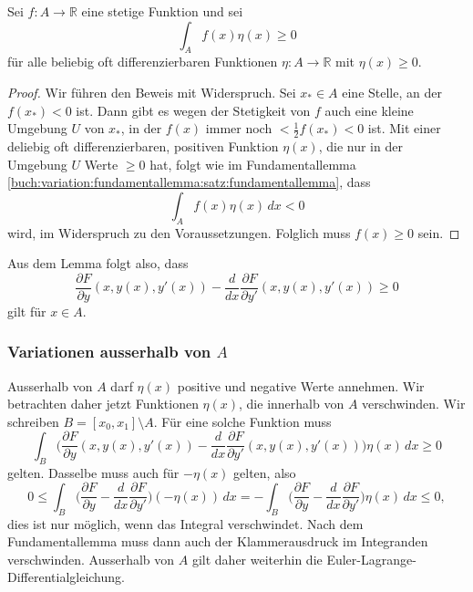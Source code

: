\begin{satz}
Sei $f\colon A\to\mathbb{R}$ eine stetige Funktion und sei
\[
\int_A f(x)\eta(x)\ge 0
\]
für alle beliebig oft differenzierbaren Funktionen $\eta\colon A\to\mathbb{R}$
mit $\eta(x)\ge 0$.
\end{satz}

\begin{proof}
Wir führen den Beweis mit Widerspruch.
Sei $x_*\in A$ eine Stelle, an der $f(x_*)<0$ ist.
Dann gibt es wegen der Stetigkeit von $f$ auch eine kleine Umgebung $U$ von
$x_*$, in der $f(x)$ immer noch $<\frac12f(x_*)<0$ ist.
Mit einer deliebig oft differenzierbaren, positiven Funktion $\eta(x)$,
die nur in der Umgebung $U$ Werte $\ge 0$ hat, folgt wie im
Fundamentallemma \ref{buch:variation:fundamentallemma:satz:fundamentallemma},
dass
\[
\int_A f(x)\eta(x)\,dx < 0
\]
wird, im Widerspruch zu den Voraussetzungen.
Folglich muss $f(x)\ge 0$ sein.
\end{proof}

Aus dem Lemma folgt also, dass
\begin{equation}
\frac{\partial F}{\partial y}(x,y(x),y'(x))
-
\frac{d}{dx}
\frac{\partial F}{\partial y'}(x,y(x),y'(x))
\ge 0
\end{equation}
gilt für $x\in A$.

%
%
\subsubsection{Variationen ausserhalb von $A$}
Ausserhalb von $A$ darf $\eta(x)$ positive und negative Werte annehmen.
Wir betrachten daher jetzt Funktionen $\eta(x)$, die innerhalb von $A$
verschwinden.
Wir schreiben $B=[x_0,x_1]\setminus A$.
Für eine solche Funktion muss
\[
\int_B \biggl(
\frac{\partial F}{\partial y}(x,y(x),y'(x))
-
\frac{d}{dx}
\frac{\partial F}{\partial y'}(x,y(x),y'(x))
\biggr)
\eta(x)
\,dx
\ge 0
\]
gelten.
Dasselbe muss auch für $-\eta(x)$ gelten, also
\[
0
\le
\int_B \biggl(
\frac{\partial F}{\partial y}
-
\frac{d}{dx}
\frac{\partial F}{\partial y'}
\biggr)
(-\eta(x))
\,dx
=
-
\int_B \biggl(
\frac{\partial F}{\partial y}
-
\frac{d}{dx}
\frac{\partial F}{\partial y'}
\biggr)
\eta(x)
\,dx
\le 0,
\]
dies ist nur möglich, wenn das Integral verschwindet.
Nach dem Fundamentallemma muss dann auch der Klammerausdruck
im Integranden verschwinden.
Ausserhalb von $A$ gilt daher weiterhin die
Euler-Lagrange-Differentialgleichung.

